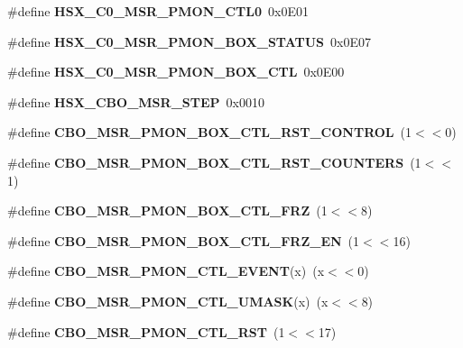 \begin{DoxyCompactItemize}
\item 
\#define {\bfseries H\+S\+X\+\_\+\+C0\+\_\+\+M\+S\+R\+\_\+\+P\+M\+O\+N\+\_\+\+C\+T\+L0}~0x0\+E01\label{types_8h_aefe839c3f8f7ed7cbc015af9d8f33d6d}

\item 
\#define {\bfseries H\+S\+X\+\_\+\+C0\+\_\+\+M\+S\+R\+\_\+\+P\+M\+O\+N\+\_\+\+B\+O\+X\+\_\+\+S\+T\+A\+T\+US}~0x0\+E07\label{types_8h_a54d94edec0a19b29a4141921474a6c5b}

\item 
\#define {\bfseries H\+S\+X\+\_\+\+C0\+\_\+\+M\+S\+R\+\_\+\+P\+M\+O\+N\+\_\+\+B\+O\+X\+\_\+\+C\+TL}~0x0\+E00\label{types_8h_a7b086658ef1778f2fac70fb80674b5b2}

\item 
\#define {\bfseries H\+S\+X\+\_\+\+C\+B\+O\+\_\+\+M\+S\+R\+\_\+\+S\+T\+EP}~0x0010\label{types_8h_a826c879043248aeec6a0b910fd0d161c}

\item 
\#define {\bfseries C\+B\+O\+\_\+\+M\+S\+R\+\_\+\+P\+M\+O\+N\+\_\+\+B\+O\+X\+\_\+\+C\+T\+L\+\_\+\+R\+S\+T\+\_\+\+C\+O\+N\+T\+R\+OL}~(1$<$$<$0)\label{types_8h_a0a3f5d0205144cf52a67d70d25bc98d3}

\item 
\#define {\bfseries C\+B\+O\+\_\+\+M\+S\+R\+\_\+\+P\+M\+O\+N\+\_\+\+B\+O\+X\+\_\+\+C\+T\+L\+\_\+\+R\+S\+T\+\_\+\+C\+O\+U\+N\+T\+E\+RS}~(1$<$$<$1)\label{types_8h_ab533675ad73fcb4947fdf64249ce6cc2}

\item 
\#define {\bfseries C\+B\+O\+\_\+\+M\+S\+R\+\_\+\+P\+M\+O\+N\+\_\+\+B\+O\+X\+\_\+\+C\+T\+L\+\_\+\+F\+RZ}~(1$<$$<$8)\label{types_8h_a386b435e56d92d7415cbf86ffe23bb77}

\item 
\#define {\bfseries C\+B\+O\+\_\+\+M\+S\+R\+\_\+\+P\+M\+O\+N\+\_\+\+B\+O\+X\+\_\+\+C\+T\+L\+\_\+\+F\+R\+Z\+\_\+\+EN}~(1$<$$<$16)\label{types_8h_ad8316e258d2a51d1aad00cf6c20ad88e}

\item 
\#define {\bfseries C\+B\+O\+\_\+\+M\+S\+R\+\_\+\+P\+M\+O\+N\+\_\+\+C\+T\+L\+\_\+\+E\+V\+E\+NT}(x)~(x$<$$<$0)\label{types_8h_ac572d0ab73f1d5516b008b15d3bec94c}

\item 
\#define {\bfseries C\+B\+O\+\_\+\+M\+S\+R\+\_\+\+P\+M\+O\+N\+\_\+\+C\+T\+L\+\_\+\+U\+M\+A\+SK}(x)~(x$<$$<$8)\label{types_8h_add8dafef2e53ac0976ab2b8c79eca357}

\item 
\#define {\bfseries C\+B\+O\+\_\+\+M\+S\+R\+\_\+\+P\+M\+O\+N\+\_\+\+C\+T\+L\+\_\+\+R\+ST}~(1$<$$<$17)\label{types_8h_a0d052a712eaf558986bbc05261824889}


\end{DoxyCompactItemize}
